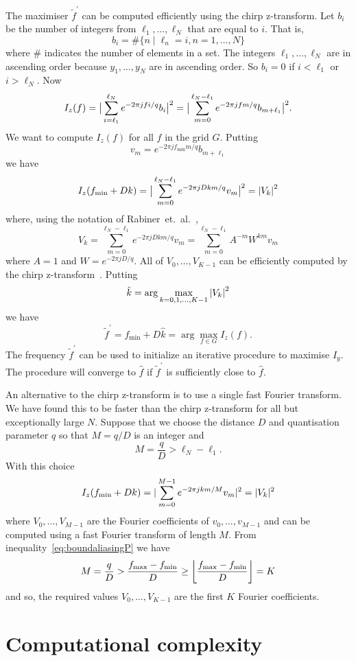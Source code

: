\documentclass[10pt,twocolumn,twoside]{IEEEtran}
\begin{document}
The maximiser $\widetilde{f}^\prime$ can be computed efficiently using the chirp z-transform.  Let $b_i$ be the number of integers from $\ell_1,\dots,\ell_N$ that are equal to $i$.  That is,
\[
b_i= \#\{ n \mid \ell_n = i, n = 1,\dots, N\}
\]
where $\#$ indicates the number of elements in a set.  The integers $\ell_1,\dots,\ell_N$ are in ascending order because $y_1,\dots,y_N$ are in ascending order.  So $b_i = 0$ if $i < \ell_1$ or $i > \ell_N$.  Now
\[
I_z(f) = \big\vert  \sum_{i = \ell_1}^{\ell_N} e^{ -2\pi j f i/q} b_i  \big\vert^2 = \big\vert  \sum_{m = 0}^{\ell_N-\ell_1} e^{ -2\pi j f m/q} b_{m+\ell_1}  \big\vert^2.
\]
We want to compute $I_z(f)$ for all $f$ in the grid $G$.  Putting
\[
v_m = e^{ -2\pi j f_{\text{min}}m/q} b_{m+\ell_1}
\]
we have
\[
I_z(f_{\text{min}} + Dk) = \big\vert  \sum_{m = 0}^{\ell_N-\ell_1} e^{ -2\pi j Dk m/q} v_m  \big\vert^2 = \left\vert V_k \right\vert^2
\]   
where, using the notation of Rabiner~et.~al.~\cite[eq.~(10)]{Rabiner1969},
\[
V_k = \sum_{m = 0}^{\ell_N-\ell_1} e^{ -2\pi j Dk m/q} v_m = \sum_{m=0}^{\ell_N-\ell_1} A^{-m} W^{km} v_m
\]
where $A = 1$ and $W = e^{ -2\pi j D/q}$.  All of $V_0,\dots,V_{K-1}$ can be efficiently computed by the chirp z-transform~\cite{Rabiner1969}.  Putting
\[
\hat{k} = \arg\max_{k = 0,1,\dots,K-1} \left\vert  V_k  \right\vert^2
\]
we have
\[ 
\widetilde{f}^\prime = f_{\text{min}} + D\hat{k} = \arg\max_{f \in G} I_z(f).
\]
The frequency $\widetilde{f}^\prime$ can be used to initialize an iterative procedure to maximise $I_y$.  The procedure will converge to $\hat{f}$ if $\widetilde{f}^\prime$ is sufficiently close to $\hat{f}$.

An alternative to the chirp z-transform is to use a single fast Fourier transform.  We have found this to be faster than the chirp z-transform for all but exceptionally large $N$.  Suppose that we choose the distance $D$ and quantisation parameter $q$ so that $M = q/D$ is an integer and
\[
M = \frac{q}{D} > \ell_N-\ell_1.
\]
With this choice
\[
I_z(f_{\text{min}} + Dk) = \vert \sum_{m = 0}^{M-1} e^{-2\pi j k m/M} v_m \vert^2 = \vert V_k \vert^2
\]
where $V_0,\dots,V_{M-1}$ are the Fourier coefficients of $v_0,\dots,v_{M-1}$ and can be computed using a fast Fourier transform of length $M$.  From inequality~\eqref{eq:boundaliasingP} we have
\[
M = \frac{q}{D} > \frac{f_{\text{max}} - f_{\text{min}}}{D} \geq {\left\lfloor \frac{f_{\text{max}} - f_{\text{min}}}{D} \right\rfloor} = K
\]
and so, the required values  $V_0,\dots,V_{K-1}$ are the first $K$ Fourier coefficients.


\section{Computational complexity}\label{sec:comp-compl}
\end{document}
